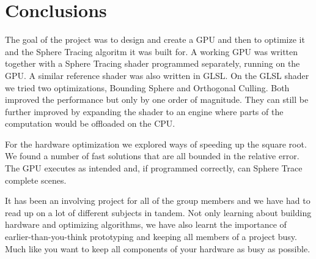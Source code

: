 \chapter{Conclusions}

	The goal of the project was to design and create a GPU and then to optimize
	it and the Sphere Tracing algoritm it was built for. A working GPU was
	written together with a Sphere Tracing shader programmed separately,
	running on the GPU. A similar reference shader was also written in GLSL. On
	the GLSL shader we tried two optimizations, Bounding Sphere and Orthogonal
	Culling. Both improved the performance but only by one order of magnitude.
	They can still be further improved by expanding the shader to an engine
	where parts of the computation would be offloaded on the CPU. 
	
	For the hardware optimization we explored ways of speeding up the square
	root.  We found a number of fast solutions that are all bounded in the
	relative error.  The GPU executes as intended and, if programmed correctly,
	can Sphere Trace complete scenes. 
	
	It has been an involving project for all of the group members and we have
	had to read up on a lot of different subjects in tandem. Not only learning
	about building hardware and optimizing algorithms, we have also learnt the
	importance of earlier-than-you-think prototyping and keeping all members of
	a project busy. Much like you want to keep all components of your hardware
	as busy as possible.
